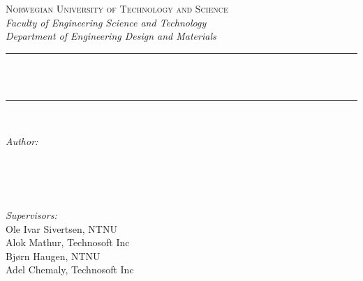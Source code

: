 \begin{titlepage}

\newcommand{\HRule}{\rule{\linewidth}{0.3mm}} %

\center
\textsc{\large Norwegian University of Technology and Science}\\[0.2cm] %
\slshape{\normalsize Faculty of Engineering Science and Technology}\\[0.1cm] %
\slshape{\normalsize Department of Engineering Design and Materials}\\[0.1cm] %



\HRule\\[0.4cm]
{ \LARGE \bfseries \textup{\mytitle}}\\[0.4cm] %
\HRule\\[1.5cm]


\begin{minipage}{0.4\textwidth}
\begin{flushleft} \small
\emph{Author:}\\
{\myauthorA} \\
{\myauthorB} \\
\phantom{A}
\end{flushleft}
\end{minipage}
~
\begin{minipage}{0.4\textwidth}
\begin{flushright} \small
\emph{Supervisors:} \\
Ole Ivar Sivertsen, NTNU \\%
Alok Mathur, Technosoft Inc \\
Bjørn Haugen, NTNU \\
Adel Chemaly, Technosoft Inc \\
\end{flushright}
\end{minipage}\\[7cm]


\end{titlepage}
